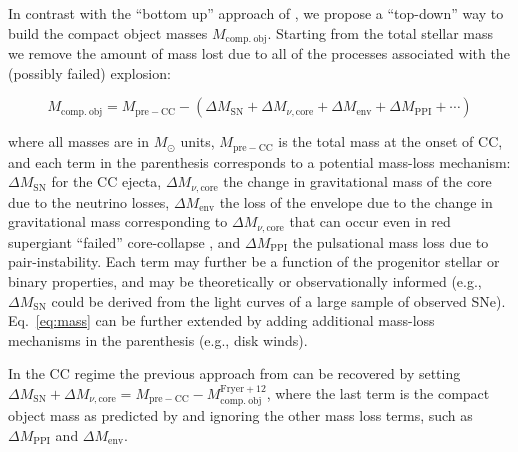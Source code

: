 \documentclass[twocolumn]{aastex63}
\DeclareRobustCommand{\Eqref}[1]{Eq.~\ref{#1}}
\newcommand{\todo}[1]{{\large $\blacksquare$~\textbf{\color{red}[#1]}}~$\blacksquare$}
\begin{document}
In contrast with the  ``bottom up'' approach of
\cite{fryer:12}, we propose a ``top-down'' way to build the compact object masses
$M_\mathrm{comp.\ obj}$. Starting from the total stellar mass we
remove the amount of mass lost due to all of the processes
associated with the (possibly failed) explosion:

\begin{widetext}
  \begin{equation}
    \label{eq:mass}
      M_\mathrm{comp.\ obj} =
      M_\mathrm{pre-CC} - \left(\Delta M_\mathrm{SN} + \Delta M_{\nu, \mathrm{core}} + \Delta M_\mathrm{env} + \Delta M_\mathrm{PPI} + \cdots \right)
  \end{equation}
\end{widetext}

where all masses are in $M_\odot$ units, $M_\mathrm{pre-CC}$ is the
total mass at the onset of CC, and each term in the parenthesis
corresponds to a potential mass-loss mechanism: $\Delta M_\mathrm{SN}$
for the CC ejecta, $\Delta M_{\nu, \mathrm{core}}$ the change in
gravitational mass of the core due to the neutrino losses,
$\Delta M_\mathrm{env}$ the loss of the envelope due to the change in
gravitational mass corresponding to $\Delta M_{\nu, \mathrm{core}}$
that can occur even in red supergiant ``failed'' core-collapse
\citep{nadezhin:80, lovegrove:13, piro:13, fernandez:18, ivanov:21},
and $\Delta M_\mathrm{PPI}$ the pulsational mass loss due to
pair-instability. Each term may further be a function of the progenitor stellar or binary
properties, and may be theoretically or observationally informed
(e.g., $\Delta M_\mathrm{SN}$ could be derived from the light curves of a
large sample of observed SNe). \Eqref{eq:mass} can be further extended by
adding additional mass-loss mechanisms in the parenthesis (e.g., disk
winds).

In the CC regime the previous approach from \cite{fryer:12} can be recovered by setting
$\Delta M_\mathrm{SN} + \Delta M_{\nu, \mathrm{core}} = M_\mathrm{pre-CC} - M_\mathrm{comp.\ obj}^\mathrm{Fryer+12}$,
where the last term is the compact object mass as predicted by
\cite{fryer:12} and ignoring the other mass loss terms,
such as $\Delta M_\mathrm{PPI}$ and $\Delta M_\mathrm{env}$.
\end{document}
